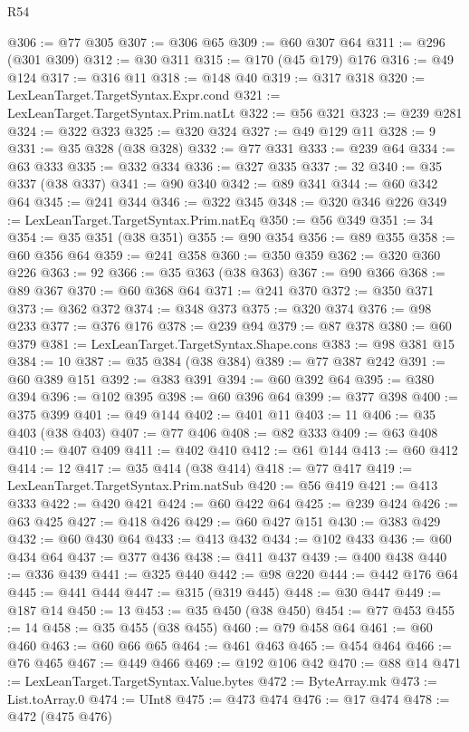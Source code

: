 \begin{lexlean}{R54}
\begin{coremodule}
@306 := @77 @305
@307 := @306 @65
@309 := @60 @307 @64
@311 := @296 (@301 @309)
@312 := @30 @311
@315 := @170 (@45 @179) @176
@316 := @49 @124
@317 := @316 @11
@318 := @148 @40
@319 := @317 @318
@320 := LexLeanTarget.TargetSyntax.Expr.cond
@321 := LexLeanTarget.TargetSyntax.Prim.natLt
@322 := @56 @321
@323 := @239 @281
@324 := @322 @323
@325 := @320 @324
@327 := @49 @129 @11
@328 := 9
@331 := @35 @328 (@38 @328)
@332 := @77 @331
@333 := @239 @64
@334 := @63 @333
@335 := @332 @334
@336 := @327 @335
@337 := 32
@340 := @35 @337 (@38 @337)
@341 := @90 @340
@342 := @89 @341
@344 := @60 @342 @64
@345 := @241 @344
@346 := @322 @345
@348 := @320 @346 @226
@349 := LexLeanTarget.TargetSyntax.Prim.natEq
@350 := @56 @349
@351 := 34
@354 := @35 @351 (@38 @351)
@355 := @90 @354
@356 := @89 @355
@358 := @60 @356 @64
@359 := @241 @358
@360 := @350 @359
@362 := @320 @360 @226
@363 := 92
@366 := @35 @363 (@38 @363)
@367 := @90 @366
@368 := @89 @367
@370 := @60 @368 @64
@371 := @241 @370
@372 := @350 @371
@373 := @362 @372
@374 := @348 @373
@375 := @320 @374
@376 := @98 @233
@377 := @376 @176
@378 := @239 @94
@379 := @87 @378
@380 := @60 @379
@381 := LexLeanTarget.TargetSyntax.Shape.cons
@383 := @98 @381 @15
@384 := 10
@387 := @35 @384 (@38 @384)
@389 := @77 @387 @242
@391 := @60 @389 @151
@392 := @383 @391
@394 := @60 @392 @64
@395 := @380 @394
@396 := @102 @395
@398 := @60 @396 @64
@399 := @377 @398
@400 := @375 @399
@401 := @49 @144
@402 := @401 @11
@403 := 11
@406 := @35 @403 (@38 @403)
@407 := @77 @406
@408 := @82 @333
@409 := @63 @408
@410 := @407 @409
@411 := @402 @410
@412 := @61 @144
@413 := @60 @412
@414 := 12
@417 := @35 @414 (@38 @414)
@418 := @77 @417
@419 := LexLeanTarget.TargetSyntax.Prim.natSub
@420 := @56 @419
@421 := @413 @333
@422 := @420 @421
@424 := @60 @422 @64
@425 := @239 @424
@426 := @63 @425
@427 := @418 @426
@429 := @60 @427 @151
@430 := @383 @429
@432 := @60 @430 @64
@433 := @413 @432
@434 := @102 @433
@436 := @60 @434 @64
@437 := @377 @436
@438 := @411 @437
@439 := @400 @438
@440 := @336 @439
@441 := @325 @440
@442 := @98 @220
@444 := @442 @176 @64
@445 := @441 @444
@447 := @315 (@319 @445)
@448 := @30 @447
@449 := @187 @14
@450 := 13
@453 := @35 @450 (@38 @450)
@454 := @77 @453
@455 := 14
@458 := @35 @455 (@38 @455)
@460 := @79 @458 @64
@461 := @60 @460
@463 := @60 @66 @65
@464 := @461 @463
@465 := @454 @464
@466 := @76 @465
@467 := @449 @466
@469 := @192 @106 @42
@470 := @88 @14
@471 := LexLeanTarget.TargetSyntax.Value.bytes
@472 := ByteArray.mk
@473 := List.toArray.{0}
@474 := UInt8
@475 := @473 @474
@476 := @17 @474
@478 := @472 (@475 @476)

\end{coremodule}
\end{lexlean}
